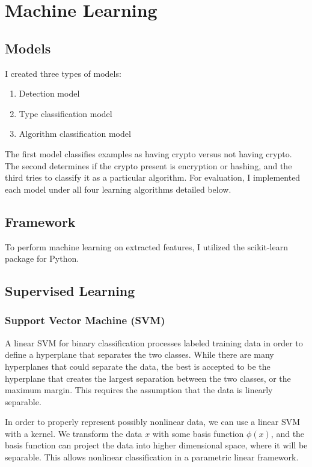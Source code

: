 \chapter{Machine Learning}

\section{Models}

I created three types of models:
\begin{enumerate}
	\item Detection model
	\item Type classification model
	\item Algorithm classification model
\end{enumerate}

The first model classifies examples as having crypto versus not having crypto.  The second determines if the crypto present is encryption or hashing, and the third tries to classify it as a particular algorithm.  For evaluation, I implemented each model under all four learning algorithms detailed below.

\section{Framework}

To perform machine learning on extracted features, I utilized the scikit-learn\cite{scikit-learn} package for Python.

\section{Supervised Learning}
\subsection{Support Vector Machine (SVM)}
A linear SVM for binary classification processes labeled training data in order to define a hyperplane that separates the two classes.  While there are many hyperplanes that could separate the data, the best is accepted to be the hyperplane that creates the largest separation between the two classes, or the maximum margin.  This requires the assumption that the data is linearly separable.

In order to properly represent possibly nonlinear data, we can use a linear SVM with a kernel.  We transform the data $x$ with some basis function $\phi(x)$, and the basis function can project the data into higher dimensional space, where it will be separable.  This allows nonlinear classification in a parametric linear framework.


